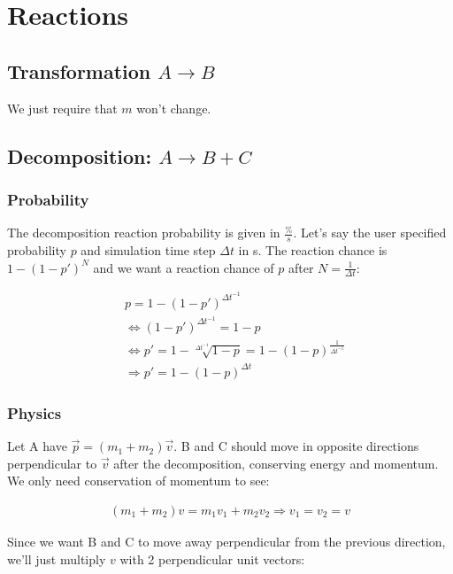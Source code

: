 \documentclass{article}
\begin{document}
	\section{Reactions}
	
	\subsection{Transformation $A \rightarrow B$}
	
	We just require that $m$ won't change. 
	
	\subsection{Decomposition: $A \rightarrow B + C$}
	
	\subsubsection*{Probability}
	
	The decomposition reaction probability is given in $\frac{\%}{s}$. Let's say the user specified probability $p$ and simulation time step $\Delta t$ in s. The reaction chance is $1 - (1 - p')^N$ and we want a reaction chance of $p$ after $N = \frac{1}{\Delta t}$:
	
	\begin{align*}
		&p = 1 - (1 - p')^{\Delta t^{-1}}\\
		&\Leftrightarrow (1 - p')^{\Delta t^{-1}} = 1 - p\\
		&\Leftrightarrow p' = 1 - \sqrt[\Delta t^{-1}]{1 - p} = 1 - (1 - p)^{\frac{1}{\Delta t^{-1}}}\\
		&\Rightarrow p' = 1 - (1 - p)^{\Delta t}
	\end{align*}
	
	\subsubsection*{Physics}
	
	Let A have $\vec{p} = (m_1 + m_2)\vec{v}$. B and C should move in opposite directions perpendicular to $\vec{v}$ after the decomposition, conserving energy and momentum. We only need conservation of momentum to see:
	
	\begin{align*}
		(m_1 + m_2)v = m_1v_1 + m_2v_2 \Rightarrow v_1 = v_2 = v
	\end{align*}

	Since we want B and C to move away perpendicular from the previous direction, we'll just multiply $v$ with 2 perpendicular unit vectors:
	
\end{document}

